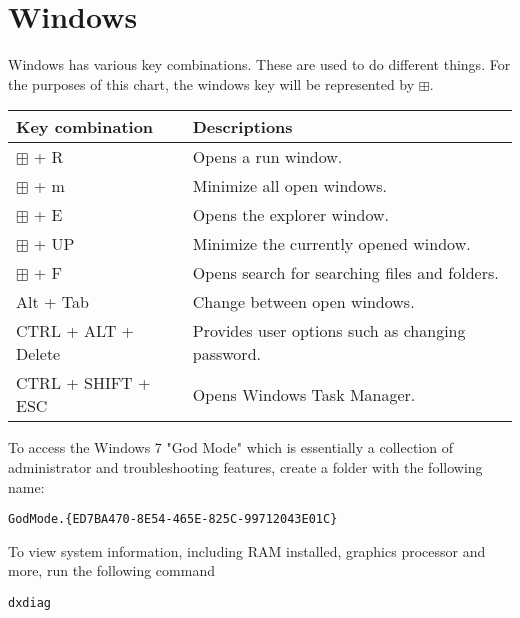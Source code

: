 \chapter{Windows}
\thispagestyle{fancy}
\lstset{language=Bash, style=bash}

\begin{fancybox}{}	
	Windows has various key combinations. These are used to do different things. For the purposes of this chart, the windows key will be represented by $\boxplus$.
	\begin{center}
		\begin{tabular}{l|l}
			Key combination & Descriptions \\
			\hline
			$\boxplus$ + R & Opens a run window. \\
			$\boxplus$ + m & Minimize all open windows. \\
			$\boxplus$ + E & Opens the explorer window. \\
			$\boxplus$ + UP & Minimize the currently opened window. \\
			$\boxplus$ + F & Opens search for searching files and folders. \\
			Alt + Tab & Change between open windows. \\
			CTRL + ALT + Delete & Provides user options such as changing password. \\
			CTRL + SHIFT + ESC & Opens Windows Task Manager. 
		\end{tabular}
	\end{center}
\end{fancybox}

To access the Windows 7 "God Mode" which is essentially a collection of administrator and troubleshooting features, create a folder with the following name:
\begin{lstlisting}
GodMode.{ED7BA470-8E54-465E-825C-99712043E01C}
\end{lstlisting}

To view system information, including RAM installed, graphics processor and more, run the following command
\begin{lstlisting}
dxdiag
\end{lstlisting} 